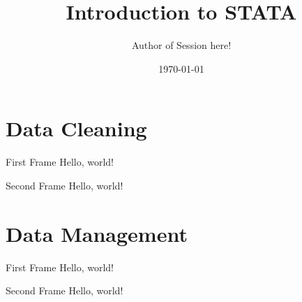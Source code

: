 \documentclass[aspectratio=169]{beamer}
\title{Introduction to STATA}
\date{\today}
\author{Author of Session here!}
\institute{Development Impact Evaluation (DIME) \newline The World Bank }
\begin{document}
	
\maketitle %
\usebackgroundtemplate{}    %


\section{Data Cleaning}	


\begin{frame}{First Frame}
Hello, world!
\end{frame}


\begin{frame}{Second Frame}
Hello, world!
\end{frame}

\section{Data Management}


\begin{frame}{First Frame}
Hello, world!
\end{frame}


\begin{frame}{Second Frame}
Hello, world!
\end{frame}
\end{document}
